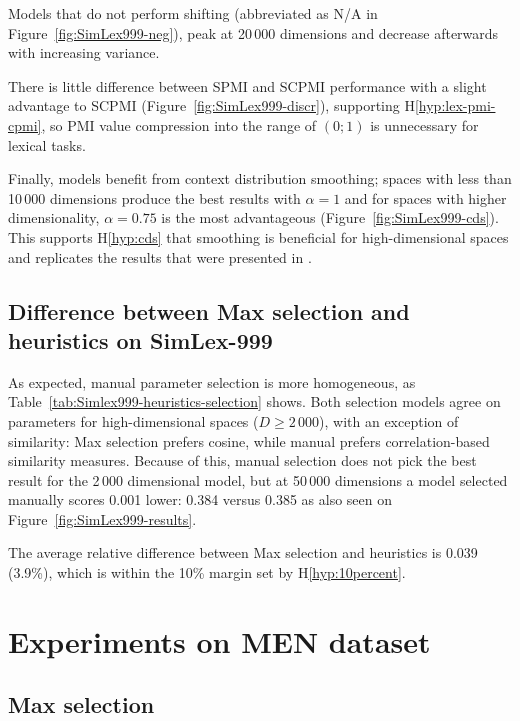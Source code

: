 Models that do not perform shifting (abbreviated as N/A in Figure~\ref{fig:SimLex999-neg}), peak at 20\,000 dimensions and decrease afterwards with increasing variance.

% 
There is little difference between SPMI and SCPMI performance with a slight advantage to SCPMI (Figure~\ref{fig:SimLex999-discr}), supporting H\ref{hyp:lex-pmi-cpmi}, so PMI value compression into the range of $(0; 1)$ is unnecessary for lexical tasks.


Finally, models benefit from context distribution smoothing; spaces with less than 10\,000 dimensions produce the best results with $\alpha = 1$ and for spaces with higher dimensionality, $\alpha = 0.75$ is the most advantageous (Figure~\ref{fig:SimLex999-cds}). This supports H\ref{hyp:cds} that smoothing is beneficial for high-dimensional spaces and replicates the results that were presented in .

\subsection{Difference between Max selection and heuristics on SimLex-999}

As expected, manual parameter selection is more homogeneous, as Table~\ref{tab:Simlex999-heuristics-selection} shows. Both selection models agree on parameters for high-dimensional spaces ($D \geq 2\,000$), with an exception of similarity: Max selection prefers cosine, while manual prefers correlation-based similarity measures. Because of this, manual selection does not pick the best result for the 2\,000 dimensional model, but at 50\,000 dimensions a model selected manually scores 0.001 lower: 0.384 versus 0.385 as also seen on Figure~\ref{fig:SimLex999-results}.

The average relative difference between Max selection and heuristics is 0.039 (3.9\%), which is within the 10\% margin set by H\ref{hyp:10percent}.


\section{Experiments on MEN dataset}
\label{sec:men}

\subsection{Max selection}
\label{sec:max-selection-men}

